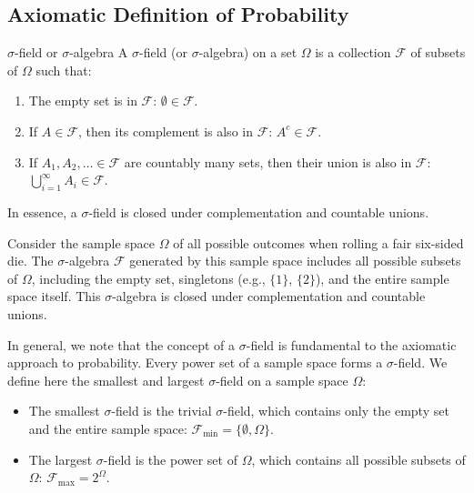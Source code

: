 \documentclass[openany]{book}
\begin{document}
\subsection{Axiomatic Definition of Probability}
\begin{mydefinition}{$\sigma$-field or $\sigma$-algebra}
    A $\sigma$-field (or $\sigma$-algebra) on a set $\Omega$ is a collection $\mathcal{F}$ of subsets of $\Omega$ such that:
    \begin{enumerate}
        \item The empty set is in $\mathcal{F}$: $\emptyset \in \mathcal{F}$.
        \item If $A \in \mathcal{F}$, then its complement is also in $\mathcal{F}$: $A^c \in \mathcal{F}$.
        \item If $A_1, A_2, \ldots \in \mathcal{F}$ are countably many sets, then their union is also in $\mathcal{F}$: $\bigcup_{i=1}^{\infty} A_i \in \mathcal{F}$.
    \end{enumerate}
    In essence, a $\sigma$-field is closed under complementation and countable unions.
\end{mydefinition}
\begin{example}
    Consider the sample space $\Omega$ of all possible outcomes when rolling a fair six-sided die. The $\sigma$-algebra $\mathcal{F}$ generated by this sample space includes all possible subsets of $\Omega$, including the empty set, singletons (e.g., $\{1\}$, $\{2\}$), and the entire sample space itself. This $\sigma$-algebra is closed under complementation and countable unions.
\end{example}
In general, we note that the concept of a $\sigma$-field is fundamental to the axiomatic approach to probability. Every power set of a sample space forms a $\sigma$-field. 
We define here the smallest and largest $\sigma$-field on a sample space $\Omega$:
\begin{itemize}
    \item The smallest $\sigma$-field is the trivial $\sigma$-field, which contains only the empty set and the entire sample space: $\mathcal{F}_{\text{min}} = \{\emptyset, \Omega\}$.
    \item The largest $\sigma$-field is the power set of $\Omega$, which contains all possible subsets of $\Omega$: $\mathcal{F}_{\text{max}} = 2^{\Omega}$.
\end{itemize}
\end{document}
